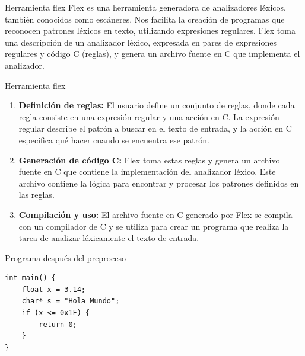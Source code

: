 \documentclass{beamer}
\begin{document}
\begin{frame}{Herramienta flex}
Flex es una herramienta generadora de analizadores léxicos, también conocidos como escáneres. Nos facilita la creación de programas que reconocen patrones léxicos en texto, utilizando expresiones regulares. Flex toma una descripción de un analizador léxico, expresada en pares de expresiones regulares y código C (reglas), y genera un archivo fuente en C que implementa el analizador.
\end{frame}

\begin{frame}{Herramienta flex}
\begin{enumerate}
 \item<1-> \textbf{Definición de reglas:} El usuario define un conjunto de reglas, donde cada regla consiste en una expresión regular y una acción en C. La expresión regular describe el patrón a buscar en el texto de entrada, y la acción en C especifica qué hacer cuando se encuentra ese patrón.
 \item<2-> \textbf{Generación de código C:} Flex toma estas reglas y genera un archivo fuente en C que contiene la implementación del analizador léxico. Este archivo contiene la lógica para encontrar y procesar los patrones definidos en las reglas.
 \item<3> \textbf{Compilación y uso:} El archivo fuente en C generado por Flex se compila con un compilador de C y se utiliza para crear un programa que realiza la tarea de analizar léxicamente el texto de entrada.
\end{enumerate}
\end{frame}

\begin{frame}[fragile]{Programa después del preproceso}{}

  \begin{lstlisting}[style=mycstyle]
int main() {
    float x = 3.14;
    char* s = "Hola Mundo";
    if (x <= 0x1F) {
        return 0;
    }
}  \end{lstlisting}
\end{frame}
\end{document}
